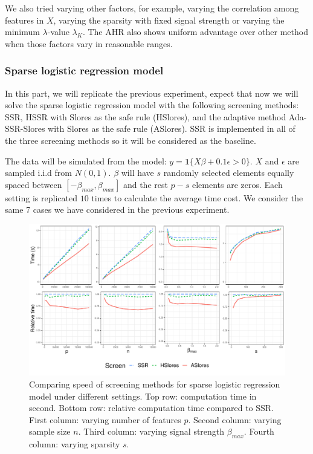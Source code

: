 We also tried varying other factors, for example, varying the correlation among features in $X$, varying the sparsity with fixed signal strength or varying the minimum $\lambda$-value $\lambda_K$. The AHR also shows uniform advantage over other method when those factors vary in reasonable ranges.

\subsubsection{Sparse logistic regression model}

In this part, we will replicate the previous experiment, expect that now we will solve the sparse logistic regression model with the following screening methods: SSR, HSSR with Slores as the safe rule (HSlores), and the adaptive method Ada-SSR-Slores with Slores as the safe rule (ASlores). SSR is implemented in all of the three screening methods so it will be considered as the baseline.

The data will be simulated from the model: $y=\mathbf{1}\{X\beta+0.1\epsilon >0\}$. $X$ and $\epsilon$ are sampled i.i.d from $N(0,1)$. $\beta$ will have $s$ randomly selected elements equally spaced between $[-\beta_{max},\beta_{max}]$ and the rest $p-s$ elements are zeros. Each setting is replicated $10$ times to calculate the average time cost. We consider the same 7 cases we have considered in the previous experiment.

\begin{figure}[h]
    \centering
    \includegraphics[scale = 0.59]{plots/bin1.pdf}    \caption{Comparing speed of screening methods for sparse logistic regression model under different settings. Top row: computation time in second. Bottom row: relative computation time compared to SSR. First column: varying number of features $p$. Second column: varying sample size $n$. Third column: varying signal strength $\beta_{max}$. Fourth column: varying sparsity $s$.}
    \label{fig:5.1.2a}
\end{figure}

